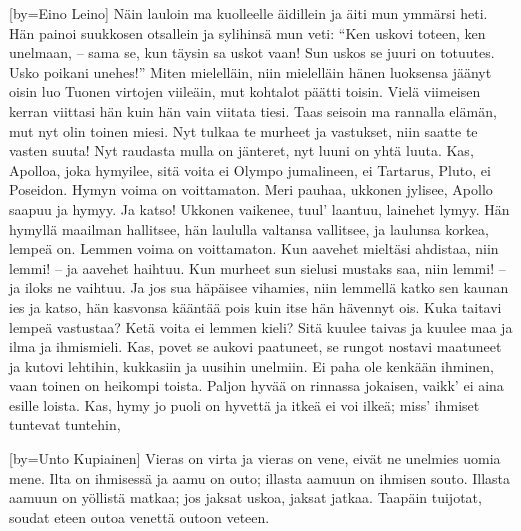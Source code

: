 [by={Eino Leino}]
  \beginverse
    Näin lauloin ma kuolleelle äidillein
    ja äiti mun ymmärsi heti.
    Hän painoi suukkosen otsallein
    ja sylihinsä mun veti:
    ``Ken uskovi toteen, ken unelmaan, --
    sama se, kun täysin sa uskot vaan!
    Sun uskos se juuri on totuutes.
    Usko poikani unehes!''
  \endverse
  \beginverse
    Miten mielelläin, niin mielelläin
    hänen luoksensa jäänyt oisin
    luo Tuonen virtojen viileäin,
    mut kohtalot päätti toisin.
    Vielä viimeisen kerran viittasi hän
    kuin hän vain viitata tiesi.
    Taas seisoin ma rannalla elämän,
    mut nyt olin toinen miesi.
  \endverse
  \beginverse
    Nyt tulkaa te murheet ja vastukset,
    niin saatte te vasten suuta!
    Nyt raudasta mulla on jänteret,
    nyt luuni on yhtä luuta.
    Kas, Apolloa, joka hymyilee,
    sitä voita ei Olympo jumalineen,
    ei Tartarus, Pluto, ei Poseidon.
    Hymyn voima on voittamaton.
  \endverse
  \beginverse
    Meri pauhaa, ukkonen jylisee,
    Apollo saapuu ja hymyy.
    Ja katso! Ukkonen vaikenee,
    tuul' laantuu, lainehet lymyy.
    Hän hymyllä maailman hallitsee,
    hän laululla valtansa vallitsee,
    ja laulunsa korkea, lempeä on.
    Lemmen voima on voittamaton.
  \endverse
  \beginverse
    Kun aavehet mieltäsi ahdistaa,
    niin lemmi! -- ja aavehet haihtuu.
    Kun murheet sun sielusi mustaks saa,
    niin lemmi! -- ja iloks ne vaihtuu.
    Ja jos sua häpäisee vihamies,
    niin lemmellä katko sen kaunan ies
    ja katso, hän kasvonsa kääntää pois
    kuin itse hän hävennyt ois.
  \endverse
  \beginverse
    Kuka taitavi lempeä vastustaa?
    Ketä voita ei lemmen kieli?
    Sitä kuulee taivas ja kuulee maa
    ja ilma ja ihmismieli.
    Kas, povet se aukovi paatuneet,
    se rungot nostavi maatuneet
    ja kutovi lehtihin, kukkasiin
    ja uusihin unelmiin.
  \endverse
  \beginverse
    Ei paha ole kenkään ihminen,
    vaan toinen on heikompi toista.
    Paljon hyvää on rinnassa jokaisen,
    vaikk' ei aina esille loista.
    Kas, hymy jo puoli on hyvettä
    ja itkeä ei voi ilkeä;
    miss' ihmiset tuntevat tuntehin,
  \endverse
\endsong


[by={Unto Kupiainen}]
  \beginverse
    Vieras on virta ja vieras on vene, 
    eivät ne unelmies uomia mene. 
    Ilta on ihmisessä ja aamu on outo; 
    illasta aamuun on ihmisen souto. 
    Illasta aamuun on yöllistä matkaa; 
    jos jaksat uskoa, jaksat jatkaa. 
    Taapäin tuijotat, soudat eteen 
    outoa venettä outoon veteen. 
  \endverse
\endsong
